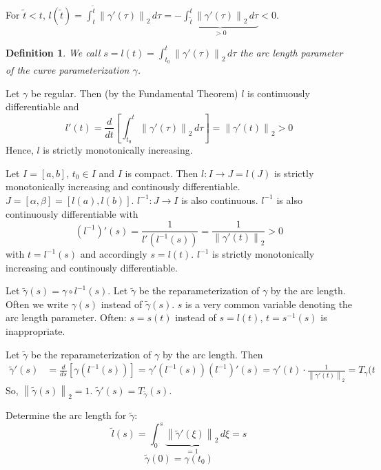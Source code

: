 \documentclass{article}
\newtheorem{definition}{Definition}  \numberwithin{definition}{section}
\newcommand{\norm}[1]{\left\|#1\right\|}
\begin{document}
For $\tilde t < t$, $l(\tilde t) = \int_{t}^{\tilde t} \norm{\gamma'(\tau)}_2 \, d\tau = -\underbrace{\int_{\tilde t}^{t} \norm{\gamma'(\tau)}_2 \, d\tau}_{> 0} < 0$.

\begin{definition}
  We call $s = l(t) = \int_{t_0}^t \norm{\gamma'(\tau)}_2 \, d\tau$ the arc length parameter of the curve parameterization $\gamma$.
\end{definition}

Let $\gamma$ be regular. Then (by the Fundamental Theorem) $l$ is continuously differentiable and
\[ l'(t) = \frac{d}{dt} \left[\int_{t_0}^t \norm{\gamma'(\tau)}_2 \, d\tau\right] = \norm{\gamma'(t)}_2 > 0 \]
Hence, $l$ is strictly monotonically increasing.

Let $I = [a,b]$, $t_0 \in I$ and $I$ is compact. Then $l: I \to J = l(J)$ is strictly monotonically increasing and continously differentiable. $J = [\alpha, \beta] = [l(a), l(b)]$. $l^{-1}: J \to I$ is also continuous. $l^{-1}$ is also continuously differentiable with
\[ (l^{-1})'(s) = \frac{1}{l'(l^{-1}(s))} = \frac{1}{\norm{\gamma'(t)}_2} > 0 \]
with $t = l^{-1}(s)$ and accordingly $s = l(t)$. $l^{-1}$ is strictly monotonically increasing and continously differentiable.

Let $\tilde\gamma(s) = \gamma \circ l^{-1}(s)$. Let $\tilde\gamma$ be the reparameterization of $\gamma$ by the arc length. Often we write $\gamma(s)$ instead of $\tilde\gamma(s)$. $s$ is a very common variable denoting the arc length parameter.
Often: $s = s(t)$ instead of $s = l(t)$, $t = s^{-1}(s)$ is inappropriate.

Let $\tilde\gamma$ be the reparameterization of $\gamma$ by the arc length. Then
\begin{align*}
  \tilde\gamma'(s) &= \frac d{ds} [\gamma(l^{-1}(s))]
    = \gamma' (l^{-1}(s)) (l^{-1})'(s)
    = \gamma' (t) \cdot \frac{1}{\norm{\gamma'(t)}_2} = T_{\gamma}(t
\end{align*}
So, $\norm{\tilde\gamma(s)}_2 = 1$. $\tilde\gamma'(s) = T_{\tilde\gamma}(s)$.

Determine the arc length for $\tilde\gamma$:
\[ \tilde l(s) = \int_0^s \underbrace{\norm{\tilde\gamma'(\xi)}_2}_{= 1} \, d\xi = s \]
\[ \tilde\gamma(0) = \gamma(t_0) \]
\end{document}
